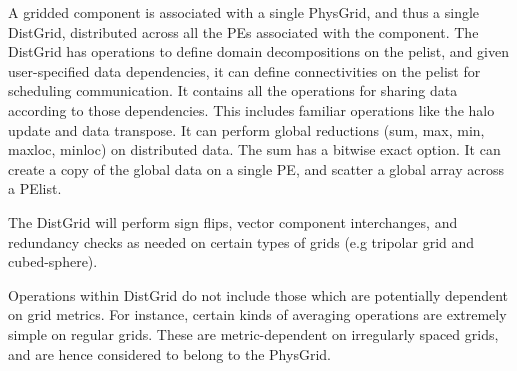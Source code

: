 A gridded component is associated with a single PhysGrid, and thus a
single DistGrid, distributed across all the PEs associated with the
component. The DistGrid has operations to define domain decompositions
on the pelist, and given user-specified data dependencies, it can
define connectivities on the pelist for scheduling communication. It
contains all the operations for sharing data according to those
dependencies. This includes familiar operations like the halo update
and data transpose. It can perform global reductions (sum, max,
min, maxloc, minloc) on distributed data. The sum has a bitwise exact
option. It can create a copy of the global data on a single PE, and
scatter a global array across a PElist.

The DistGrid will perform sign flips, vector component interchanges,
and redundancy checks as needed on certain types of grids (e.g
tripolar grid and cubed-sphere).

Operations within DistGrid do not include those which are potentially
dependent on grid metrics. For instance, certain kinds of averaging
operations are extremely simple on regular grids. These are
metric-dependent on irregularly spaced grids, and are hence considered
to belong to the PhysGrid.
